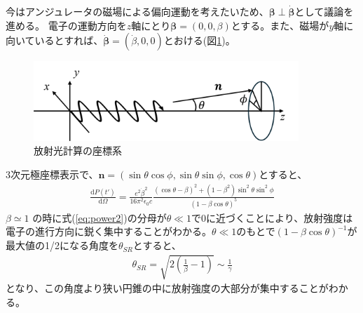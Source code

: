 \documentclass[a4paper,11pt,uplatex]{jsbook}
\begin{document}
今はアンジュレータの磁場による偏向運動を考えたいため、$\bm{\beta} \perp \bm{\dot{\beta}}$として議論を進める。
電子の運動方向を$z$軸にとり$\bm{\beta} = (0,0,\beta)$とする。また、磁場が$y$軸に向いているとすれば、$\bm{\dot{\beta}} = (\dot{\beta},0,0)$とおける(図\ref{cordinate})。
\begin{figure}[H]
  \centering
  \includegraphics[width=10cm]{image/2-cordinate.png}
  \caption{放射光計算の座標系}\label{cordinate}
\end{figure}

3次元極座標表示で、$\bm{n} = (\sin\theta\cos\phi,\sin\theta\sin\phi,\cos\theta)$とすると、
\begin{eqnarray}\label{eq:power2}
  \frac{\text{d}P(t')}{\text{d}\Omega} = \frac{e^2\dot{\beta}^2}{16\pi^2 \epsilon_0 c}\frac{(\cos\theta - \beta)^2 + (1-\beta^2)\sin^2\theta\sin^2\phi}{(1-\beta \cos\theta)^5}
\end{eqnarray}
$\beta \simeq 1$ の時に式(\ref{eq:power2})の分母が$\theta \ll 1$で0に近づくことにより、放射強度は電子の進行方向に鋭く集中することがわかる。$\theta \ll 1$のもとで$(1-\beta\cos\theta)^{-1}$が最大値の1/2になる角度を$\theta_{SR}$とすると、
\begin{eqnarray}
  \theta_{SR} = \sqrt{2\left(\frac{1}{\beta} -1\right)} \sim \frac{1}{\gamma}
\end{eqnarray}
となり、この角度より狭い円錐の中に放射強度の大部分が集中することがわかる。
\end{document}
